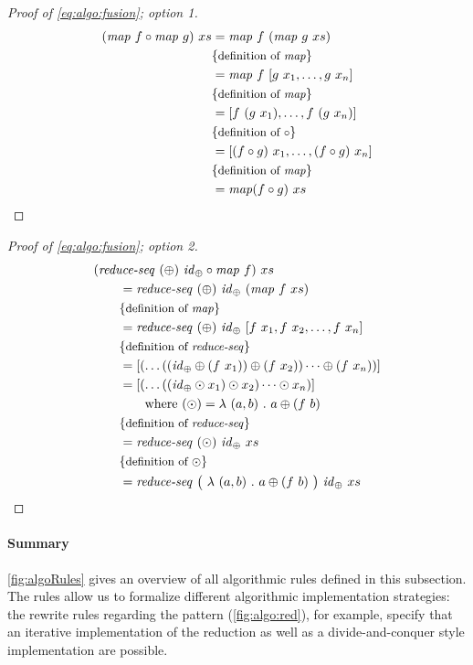 \begin{proof}[Proof of \autoref{eq:algo:fusion}; option 1]
  \begin{align*}
    (\text{\textit{map}}\ f\circ \text{\textit{map}}\ g)\ xs
      &= \text{\textit{map}}\ f\ (\text{\textit{map}}\ g\ xs)\\
      &\{\text{\small definition of \text{\textit{map}}}\}\\
      &= \text{\textit{map}}\ f\ [g\ x_1, \ldots, g\ x_n]\\
      &\{\text{\small definition of \text{\textit{map}}}\}\\
      &= [f\ (g\ x_1), \ldots, f\ (g\ x_n)]\\
      &\{\text{\small definition of $\circ$}\}\\
      &= [(f\circ g)\ x_1, \ldots, (f\circ g)\ x_n]\\
      &\{\text{\small definition of \text{\textit{map}}}\}\\
      &= \text{\textit{map}} (f\circ g)\ xs
  \end{align*}
\end{proof}
\begin{proof}[Proof of \autoref{eq:algo:fusion}; option 2]
  \begin{align*}
    &(\reduceSeq\ (\oplus)\ \id_\oplus \circ \map\ f)\ xs\\
    &\qquad = \reduceSeq\ (\oplus)\ \id_\oplus\ (\map\ f\ xs)\\
    &\qquad \comment{definition of \map}\\
    &\qquad = \reduceSeq\ (\oplus)\ \id_\oplus\ [f\ x_1, f\ x_2, \ldots, f\ x_n]\\
    &\qquad \comment{definition of \reduceSeq}\\
    &\qquad = [ (\dots ((\id_\oplus \oplus (f\ x_1)) \oplus (f\ x_2)) \dots \oplus (f\ x_n)) ]\\
    &\qquad = [ (\dots ((\id_\oplus \odot x_1) \odot x_2) \dots \odot x_n) ]\\
    &\qquad\qquad \text{where } (\odot) = \lambda\ (a,b)\ .\ a \oplus (f\ b)\\
    &\qquad \comment{definition of \reduceSeq}\\
    &\qquad = \reduceSeq\ (\odot)\ \id_\oplus\ xs\\
    &\qquad \comment{definition of $\odot$}\\
    &\qquad = \reduceSeq\ \big(\ \lambda\ (a,b)\ .\ a \oplus (f\ b)\ \big)\ \id_\oplus\ xs
  \end{align*}
\end{proof}

\paragraph{Summary}
\autoref{fig:algoRules} gives an overview of all algorithmic rules defined in this subsection.
The rules allow us to formalize different algorithmic implementation strategies:
the rewrite rules regarding the \reduce pattern (\autoref{fig:algo:red}), for example, specify that an iterative implementation of the reduction as well as a divide-and-conquer style implementation are possible.

